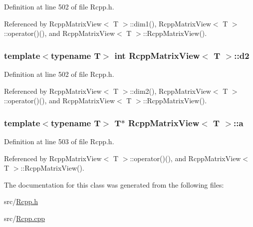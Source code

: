 Definition at line 502 of file Rcpp.h.

Referenced by RcppMatrixView$<$ T $>$::dim1(), RcppMatrixView$<$ T $>$::operator()(), and RcppMatrixView$<$ T $>$::RcppMatrixView().\hypertarget{classRcppMatrixView_37b5f5806957eeb0b688d6a157a2a264}{
\subsubsection[d2]{\setlength{\rightskip}{0pt plus 5cm}template$<$typename T$>$ int {\bf RcppMatrixView}$<$ T $>$::{\bf d2}}}
\label{classRcppMatrixView_37b5f5806957eeb0b688d6a157a2a264}




Definition at line 502 of file Rcpp.h.

Referenced by RcppMatrixView$<$ T $>$::dim2(), RcppMatrixView$<$ T $>$::operator()(), and RcppMatrixView$<$ T $>$::RcppMatrixView().\hypertarget{classRcppMatrixView_d38481118f63a84a132e8f2265de5bdd}{
\subsubsection[a]{\setlength{\rightskip}{0pt plus 5cm}template$<$typename T$>$ T$\ast$ {\bf RcppMatrixView}$<$ T $>$::{\bf a}}}
\label{classRcppMatrixView_d38481118f63a84a132e8f2265de5bdd}




Definition at line 503 of file Rcpp.h.

Referenced by RcppMatrixView$<$ T $>$::operator()(), and RcppMatrixView$<$ T $>$::RcppMatrixView().

The documentation for this class was generated from the following files:\begin{CompactItemize}
\item 
src/\hyperlink{Rcpp_8h}{Rcpp.h}\item 
src/\hyperlink{Rcpp_8cpp}{Rcpp.cpp}\end{CompactItemize}
